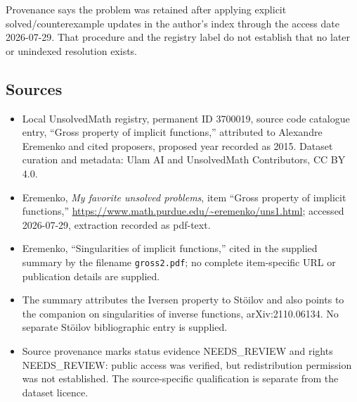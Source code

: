 \documentclass[11pt]{article}
\begin{document}
Provenance says the problem was retained after applying explicit solved/counterexample updates in the author's index through the access date 2026-07-29. That procedure and the registry label do not establish that no later or unindexed resolution exists.
\subsection{Sources}
\begin{itemize}
\item Local UnsolvedMath registry, permanent ID 3700019, source code catalogue entry, ``Gross property of implicit functions,'' attributed to Alexandre Eremenko and cited proposers, proposed year recorded as 2015. Dataset curation and metadata: Ulam AI and UnsolvedMath Contributors, CC BY 4.0.
\item Eremenko, \emph{My favorite unsolved problems}, item ``Gross property of implicit functions,'' \url{https://www.math.purdue.edu/~eremenko/uns1.html}; accessed 2026-07-29, extraction recorded as pdf-text.
\item Eremenko, ``Singularities of implicit functions,'' cited in the supplied summary by the filename \texttt{gross2.pdf}; no complete item-specific URL or publication details are supplied.
\item The summary attributes the Iversen property to Stöilov and also points to the companion on singularities of inverse functions, arXiv:2110.06134. No separate Stöilov bibliographic entry is supplied.
\item Source provenance marks status evidence NEEDS\_REVIEW and rights NEEDS\_REVIEW: public access was verified, but redistribution permission was not established. The source-specific qualification is separate from the dataset licence.
\end{itemize}
\end{document}
